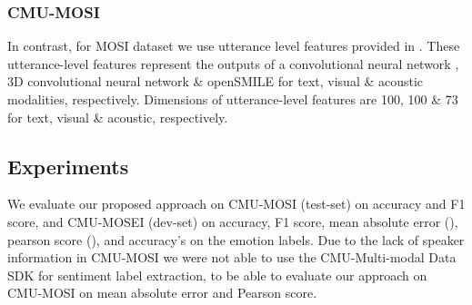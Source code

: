 \documentclass[11pt,a4paper]{article}
\begin{document}
\subsubsection{CMU-MOSI}
In contrast, for MOSI dataset we use utterance level features provided in \citet{poria2}. These utterance-level features represent the outputs of a convolutional neural network \cite{cnn}, 3D convolutional neural network \cite{3dcnn} \& openSMILE \cite{opensmile} for text, visual \& acoustic modalities, respectively. Dimensions of utterance-level features are 100, 100 \& 73 for text, visual \& acoustic, respectively.

\subsection{Experiments}

We evaluate our proposed approach on CMU-MOSI (test-set) on accuracy and F1 score, and CMU-MOSEI (dev-set) on accuracy, F1 score, mean absolute error (), pearson score (), and accuracy's on the emotion labels. Due to the lack of speaker information in CMU-MOSI we were not able to use the CMU-Multi-modal Data SDK for sentiment label extraction, to be able to evaluate our approach on CMU-MOSI on mean absolute error and Pearson score.
\end{document}
